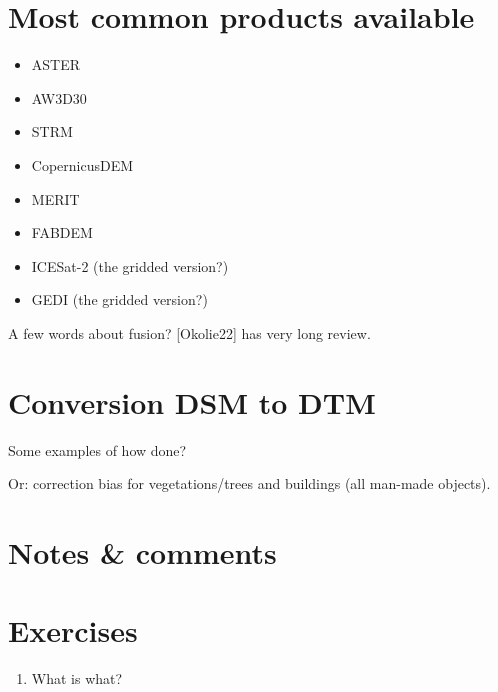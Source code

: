 %
\section[Most common products]{Most common products available}

\begin{itemize}
  \item ASTER
  \item AW3D30
  \item STRM
  \item CopernicusDEM
  \item MERIT
  \item FABDEM
  \item ICESat-2 (the gridded version?)
  \item GEDI (the gridded version?)
\end{itemize}

A few words about fusion? [Okolie22] has very long review.


%
\section{Conversion DSM to DTM}

Some examples of how done?

Or: correction bias for vegetations/trees and buildings (all man-made objects).

%
\section{Notes \& comments}


%
\section{Exercises}

\begin{enumerate}
  \item What is what?
\end{enumerate}
